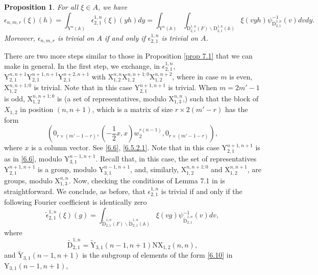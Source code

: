\documentclass[12pts]{amsart}
\newcommand{\BA}{{\mathbb {A}}}
\newtheorem{prop}[thm]{Proposition}
\begin{document}
\begin{prop}\label{prop 7.2}
For all $\xi\in A$, we have
$$
\epsilon_{n,m,r}(\xi)(h)=\int_{\mathrm{Y}^n(\BA)}\epsilon_{2,1}^{1,n}(\xi)(yh)dy
=\int_{\mathrm{Y}^n(\BA)}\int_{\mathrm{D}_{2,1}^{1,n}(F)\backslash \mathrm{D}_{2,1}^{1,n}(\BA)}\xi(vyh)\psi^{-1}_{\mathrm{D}_{2,1}^{1,n}}(v)dvdy.
$$
Moreover, $\epsilon_{n,m,r}$ is trivial on 	$A$ if and only if 
$\epsilon_{2,1}^{1,n}$ is trivial on $A$.
\end{prop}

There are two more steps similar to those in Proposition \ref{prop
7.1} that we can make in general. In the first step, we exchange, in
$\epsilon_{2,1}^{1,n}$,
$\mathrm{Y}_{2,1}^{n,n+1}\mathrm{Y}_{2,1}^{n+1,n+1}\mathrm{Y}_{2,1}^{n+2,n+1}$ with
$\mathrm{X}_{1,2}^{n,n}\mathrm{X}_{1,2}^{n,n+1;0}\mathrm{X}_{1,2}^{n,n+2}$, where in case $m$ is even, $\mathrm{X}_{1,2}^{n,n+1;0}$ is trivial. Note that in this case $\mathrm{Y}_{2,1}^{n+1,n+1}$ is trivial. When $m=2m'-1$ is odd, $\mathrm{X}_{1,2}^{n,n+1;0}$ is (a set of representatives, modulo $\mathrm{X}_{1,3}^{n,n}$,) such that the block of $X_{1,2}$ in position $(n,n+1)$, which is a matrix of size $r\times 2(m'-r)$ has the form
$$
(0_{r\times (m'-1-r)},(-\frac{1}{2}x,x)w_2^{r(n-1)},0_{r\times (m'-1-r)}),
$$
where $x$ is a column vector. See \eqref{6.6}, \eqref{6.5.2.1}. Note that in this case $\mathrm{Y}_{2,1}^{n+1,n+1}$ is as in \eqref{6.6},
modulo $\mathrm{Y}_{3,1}^{n-1,n+1}$. Recall that, in this case, the set of representatives $\mathrm{Y}_{2,1}^{n+1,n+1}$ is a group, modulo $\mathrm{Y}_{3,1}^{n-1,n+1}$, and, similarly, $\mathrm{X}_{1,2}^{n,n+1;0}$ and $\mathrm{X}_{1,2}^{n,n+1}$, are groups, modulo $\mathrm{X}_{1,3}^{n,n}$. Now, checking the conditions of Lemma
7.1 in \cite{GRS11} is straightforward. We conclude, as before, that
$\epsilon_{2,1}^{1,n}$ is trivial if and only if the following
Fourier coefficient is identically zero
\begin{equation}\label{7.2}
\widetilde{\epsilon}_{2,1}^{1,n}(\xi)(g)=\int_{\widetilde{\mathrm{D}}_{2,1}^{1,n}(F)\backslash
	\widetilde{\mathrm{D}}_{2,1}^{1,n}(\BA)}\xi(vg)\psi_{\widetilde{\mathrm{D}}_{2,1}^{1,n}}^{-1}(v)dv,
\end{equation}
where
\begin{equation}\label{7.3}
\widetilde{\mathrm{D}}_{2,1}^{1,n}=\widetilde{\mathrm{Y}}_{3,1}(n-1,n+1)\mathrm{N}\mathrm{X}_{1,2}(n,n),
\end{equation}
and $\widetilde{\mathrm{Y}}_{3,1}(n-1,n+1)$ is the subgroup of
elements of the form \eqref{6.10} in $\mathrm{Y}_{3,1}(n-1,n+1)$,
\end{document}
